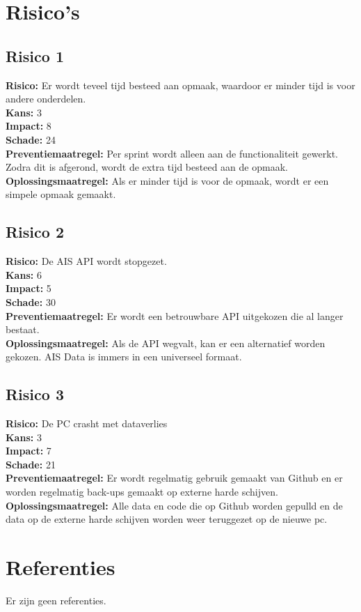 \documentclass{article}
\begin{document}
\section{Risico's}
\subsection{Risico 1}
\begin{tcolorbox}[colback=white, colframe=orange, title=Risico 1]
\textbf{Risico:} Er wordt teveel tijd besteed aan opmaak, waardoor er minder tijd is voor andere onderdelen. \\
\textbf{Kans:} 3 \\
\textbf{Impact:} 8 \\
\textbf{Schade:} 24 \\
\textbf{Preventiemaatregel:} Per sprint wordt alleen aan de functionaliteit gewerkt. Zodra dit is afgerond, wordt de extra tijd besteed aan de opmaak. \\
\textbf{Oplossingsmaatregel:} Als er minder tijd is voor de opmaak, wordt er een simpele opmaak gemaakt. \\
\end{tcolorbox}

\subsection{Risico 2}
\begin{tcolorbox}[colback=white, colframe=red, title=Risico 2]
\textbf{Risico:} De AIS API wordt stopgezet. \\
\textbf{Kans:} 6 \\
\textbf{Impact:} 5 \\
\textbf{Schade:} 30 \\
\textbf{Preventiemaatregel:} Er wordt een betrouwbare API uitgekozen die al langer bestaat. \\
\textbf{Oplossingsmaatregel:} Als de API wegvalt, kan er een alternatief worden gekozen. AIS Data is immers in een universeel formaat. \\
\end{tcolorbox}

\subsection{Risico 3}
\begin{tcolorbox}[colback=white, colframe=green,coltitle=black, title=Risico 3 (Gehaald uit de template)]
\textbf{Risico:} De PC crasht met dataverlies\\
\textbf{Kans:} 3 \\
\textbf{Impact:} 7 \\
\textbf{Schade:} 21 \\
\textbf{Preventiemaatregel:} Er wordt regelmatig gebruik gemaakt van Github en er worden regelmatig back-ups gemaakt op externe harde schijven. \\
\textbf{Oplossingsmaatregel:} Alle data en code die op Github worden gepulld en de data op de externe harde schijven worden weer teruggezet op de nieuwe pc. \\
\end{tcolorbox}



\section{Referenties}
Er zijn geen referenties.
\end{document}
